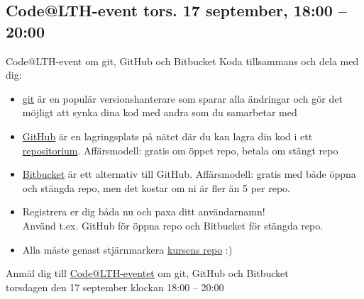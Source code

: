 \documentclass{lecturenotes}
\begin{document}
\subsection{Code@LTH-event tors. 17 september, 18:00 – 20:00}
\begin{Slide}{Code@LTH-event om git, GitHub och Bitbucket}\footnotesize
Koda tillsammans och dela med dig:
\begin{itemize}
\item \href{https://git-scm.com/}{git} är en populär versionshanterare som sparar alla ändringar  och gör det möjligt att synka dina kod med andra som du samarbetar med
\item \href{https://github.com/}{GitHub} är en lagringsplats på nätet där du kan lagra din kod i ett \href{https://en.wikipedia.org/wiki/Repository_\%28version_control\%29}{repositorium}. Affärsmodell: gratis om öppet repo, betala om stängt repo
\item \href{https://bitbucket.org/}{Bitbucket} är ett alternativ till GitHub. Affärsmodell: gratis med både öppna och stängda repo, men det kostar om ni är fler än 5 per repo.
\item Registrera er dig båda nu och paxa ditt användarnamn! \\ Använd t.ex. GitHub för öppna repo och Bitbucket för stängda repo. 
\item Alla måste genast stjärnmarkera \href{https://github.com/bjornregnell/lth-eda016-2015}{kursens repo} :) 
\end{itemize}
Anmäl dig till \href{http://www.codeatlth.org/}{Code@LTH-eventet} om git, GitHub och Bitbucket\\torsdagen den 17 september klockan 18:00 – 20:00
\end{Slide}
\end{document}
